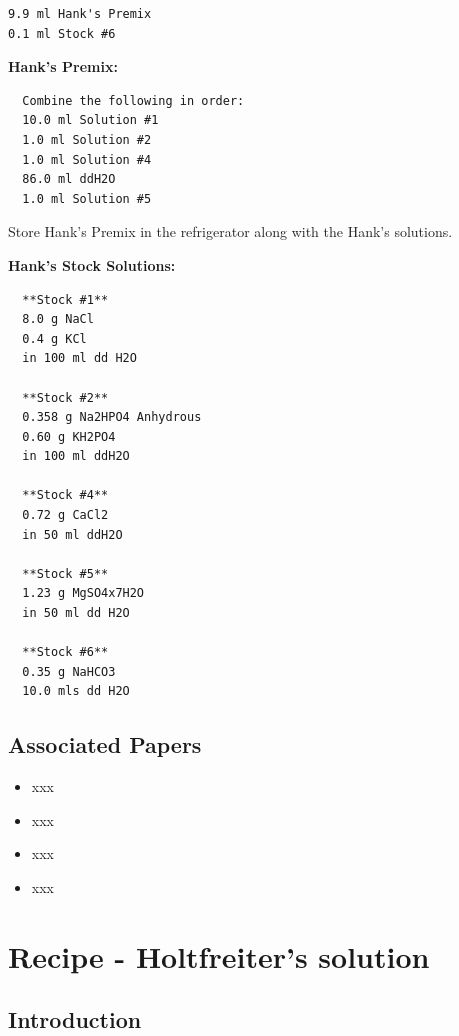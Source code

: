 \documentclass[
  letterpaper,
  DIV=11,
  numbers=noendperiod]{scrreprt}
\providecommand{\tightlist}{%
  \setlength{\itemsep}{0pt}\setlength{\parskip}{0pt}}\usepackage{longtable,booktabs,array}
\begin{document}
\begin{verbatim}
9.9 ml Hank's Premix
0.1 ml Stock #6
\end{verbatim}

\textbf{Hank's Premix:}

\begin{verbatim}
  Combine the following in order:
  10.0 ml Solution #1
  1.0 ml Solution #2
  1.0 ml Solution #4
  86.0 ml ddH2O
  1.0 ml Solution #5
\end{verbatim}

Store Hank's Premix in the refrigerator along with the Hank's solutions.

\textbf{Hank's Stock Solutions:}

\begin{verbatim}
  **Stock #1**
  8.0 g NaCl 
  0.4 g KCl
  in 100 ml dd H2O
  
  **Stock #2**
  0.358 g Na2HPO4 Anhydrous 
  0.60 g KH2PO4 
  in 100 ml ddH2O
  
  **Stock #4**
  0.72 g CaCl2 
  in 50 ml ddH2O
  
  **Stock #5**
  1.23 g MgSO4x7H2O 
  in 50 ml dd H2O
  
  **Stock #6**
  0.35 g NaHCO3
  10.0 mls dd H2O
\end{verbatim}

\hypertarget{associated-papers-79}{%
\section{Associated Papers}\label{associated-papers-79}}

\begin{itemize}
\tightlist
\item
  xxx
\item
  xxx
\item
  xxx
\item
  xxx
\end{itemize}

\hypertarget{sec-recipe-holtfrieters}{%
\chapter{Recipe - Holtfreiter's
solution}\label{sec-recipe-holtfrieters}}

\hypertarget{introduction-111}{%
\section{Introduction}\label{introduction-111}}
\end{document}

